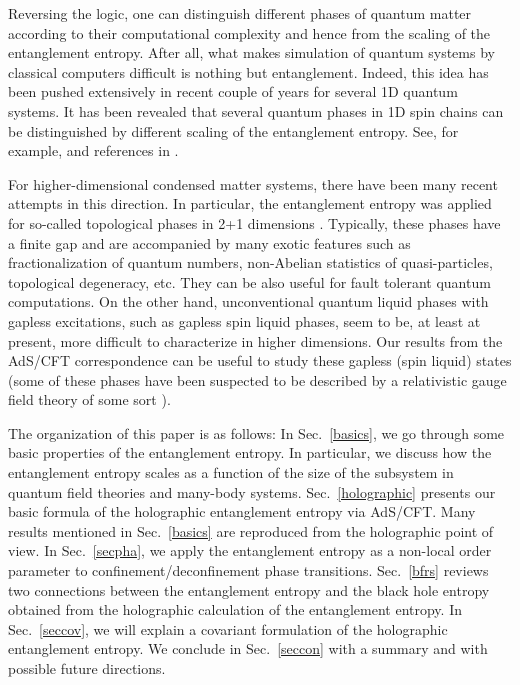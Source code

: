 \documentclass[12pt]{article}
\begin{document}
Reversing the logic, one can distinguish different phases of
quantum matter according to their computational complexity
and hence from the scaling of the entanglement entropy.
After all, what makes simulation of quantum systems by classical computers
difficult is nothing but entanglement.
Indeed, this idea has been pushed extensively in recent couple of
years for several 1D quantum systems. It has been revealed that
several quantum phases in 1D spin chains
can be distinguished by different scaling of the entanglement
entropy. See, for example,
\cite{Vidal03, Latorre04, Peschel04, Jin03, Its05} and
references in \cite{Cardy}.

For higher-dimensional condensed matter systems,
there have been many recent attempts in this direction.
In particular,
the entanglement entropy was applied
for so-called topological phases
in 2+1 dimensions
\cite{Kitaev05, Levin05}.
Typically, these phases
have a finite gap and
are accompanied
by many exotic features such as
fractionalization of quantum numbers,
non-Abelian statistics of quasi-particles,
topological degeneracy, etc.
They can be also useful
for fault tolerant quantum computations.
On the other hand, unconventional quantum liquid phases with gapless
excitations, such as gapless spin liquid phases, seem to be, at
least at present, more difficult to characterize in higher
dimensions. Our results from the AdS/CFT correspondence can be useful to
study these gapless (spin liquid) states (some of these phases have
been suspected to be described by a relativistic gauge field theory
of some sort \cite{Wen89}).

The organization of this paper is as follows:
In Sec.\ \ref{basics},
we go through some basic properties of
the entanglement entropy.
In particular,
we discuss how the entanglement entropy scales as a function
of the size of the subsystem in quantum field theories
and many-body systems.
Sec.\ \ref{holographic} presents our basic formula of the holographic entanglement entropy via AdS/CFT.
Many results mentioned in Sec.\ \ref{basics} are reproduced
from the holographic point of view.
In Sec.\ \ref{secpha},
we apply the entanglement entropy
as a non-local order parameter to
confinement/deconfinement phase transitions.
Sec.\ \ref{bfrs} reviews
two connections between
the entanglement entropy and the black hole entropy
obtained from the holographic calculation of the entanglement entropy.
In Sec.\ \ref{seccov}, we will explain a covariant formulation of
the holographic entanglement entropy. We conclude in Sec.\ \ref{seccon}
with a summary
and with possible future directions.
\end{document}
